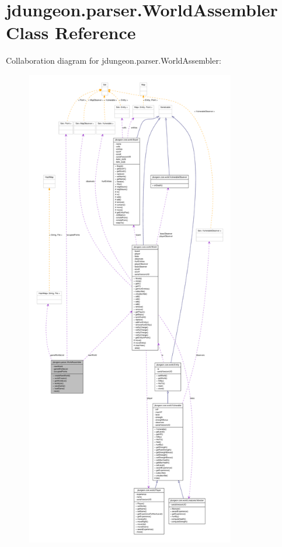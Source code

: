 \hypertarget{classjdungeon_1_1parser_1_1_world_assembler}{
\section{jdungeon.parser.WorldAssembler Class Reference}
\label{classjdungeon_1_1parser_1_1_world_assembler}
}


Collaboration diagram for jdungeon.parser.WorldAssembler:
\nopagebreak
\begin{figure}[H]
\begin{center}
\leavevmode
\includegraphics[height=600pt]{classjdungeon_1_1parser_1_1_world_assembler__coll__graph}
\end{center}
\end{figure}
